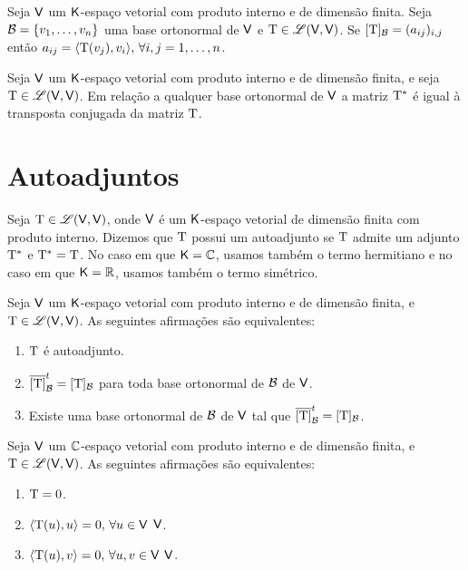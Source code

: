 \documentclass[10pt,a4paper]{book}
\begin{document}
\begin{proposition}
	Seja $\mathsf{ V }$ um $\mathsf{ K }$-espaço vetorial com produto interno e de dimensão finita. Seja $\mathcal{ B } = \{ v_1, \dots, v_n \}$ uma base ortonormal de $\mathsf{ V }$ e $\mathrm{ T } \in \mathscr{ L }(\mathsf{ V }, \mathsf{ V })$. Se $[\mathrm{ T }]_{\mathcal{ B }} = (a_{ij})_{i, j}$ então $a_{ij} = \langle \mathrm{ T }(v_j), v_i \rangle, \, \forall i,j = 1, \dots, n$.
\end{proposition}

\begin{theorem}
	Seja $\mathsf{ V }$ um $\mathsf{ K }$-espaço vetorial com produto interno e de dimensão finita, e seja $\mathrm{ T } \in \mathscr{ L }(\mathsf{ V }, \mathsf{ V })$. Em relação a qualquer base ortonormal de $\mathsf{ V }$ a matriz $\mathrm{ T ^ *}$ é igual à transposta conjugada da matriz $\mathrm{ T }$.
\end{theorem}




\section{Autoadjuntos}

\begin{definition}
	Seja $\mathrm{ T } \in \mathscr{ L }(\mathsf{ V }, \mathsf{ V })$, onde $\mathsf{ V }$ é um $\mathsf{ K }$-espaço vetorial de dimensão finita com produto interno. Dizemos que $\mathrm{ T }$ possui um autoadjunto se $\mathrm{ T }$ admite um adjunto $\mathrm{ T ^ *}$ e $\mathrm{ T ^ *} = \mathrm{ T }$. No caso em que $\mathsf{ K } = \mathbb{ C }$, usamos também o termo hermitiano e no caso em que $\mathsf{ K } = \mathbb{ R }$, usamos também o termo simétrico.
\end{definition}

\begin{theorem}
	Seja $\mathsf{ V }$ um $\mathsf{ K }$-espaço vetorial com produto interno e de dimensão finita, e $\mathrm{ T } \in \mathscr{ L }(\mathsf{ V }, \mathsf{ V })$. As seguintes afirmações são equivalentes:
	\begin{enumerate}
		\item $\mathrm{ T }$ é autoadjunto.
		\item $\overline{[\mathrm{ T }]}_{\mathcal{ B }}^t = [\mathrm{ T }]_{\mathcal{ B }}$ para toda base ortonormal de $\mathcal{ B }$ de $\mathsf{ V }$.
		\item Existe uma base ortonormal de $\mathcal{ B }$ de $\mathsf{ V }$ tal que $\overline{[\mathrm{ T }]}_{\mathcal{ B }}^t = [\mathrm{ T }]_{\mathcal{ B }}$.
	\end{enumerate}
\end{theorem}

\begin{lemma}
	Seja $\mathsf{ V }$ um $\mathbb{ C }$-espaço vetorial com produto interno e de dimensão finita, e $\mathrm{ T } \in \mathscr{ L }(\mathsf{ V }, \mathsf{ V })$. As seguintes afirmações são equivalentes:
	\begin{enumerate}
		\item $\mathrm{ T } = 0$.
		\item $\langle \mathrm{ T }(u), u \rangle = 0, \, \forall u \in \mathsf{ V }$ $\mathsf{ V }$.
		\item $\langle \mathrm{ T }(u), v \rangle = 0, \, \forall u, v \in \mathsf{ V }$ $\mathsf{ V }$.
	\end{enumerate}
\end{lemma}
\end{document}
